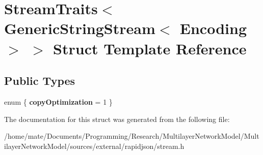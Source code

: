 \hypertarget{structStreamTraits_3_01GenericStringStream_3_01Encoding_01_4_01_4}{}\section{Stream\+Traits$<$ Generic\+String\+Stream$<$ Encoding $>$ $>$ Struct Template Reference}
\label{structStreamTraits_3_01GenericStringStream_3_01Encoding_01_4_01_4}
\subsection*{Public Types}
\begin{DoxyCompactItemize}
\item 
enum \{ {\bfseries copy\+Optimization} = 1
 \}\hypertarget{structStreamTraits_3_01GenericStringStream_3_01Encoding_01_4_01_4_a36081c50934bef71843a4d351a98612e}{}\label{structStreamTraits_3_01GenericStringStream_3_01Encoding_01_4_01_4_a36081c50934bef71843a4d351a98612e}

\end{DoxyCompactItemize}


The documentation for this struct was generated from the following file\+:\begin{DoxyCompactItemize}
\item 
/home/mate/\+Documents/\+Programming/\+Research/\+Multilayer\+Network\+Model/\+Multilayer\+Network\+Model/sources/external/rapidjson/stream.\+h\end{DoxyCompactItemize}
